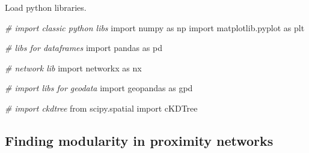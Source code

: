 \documentclass[]{article}
\newenvironment{Shaded}{\begin{snugshade}}{\end{snugshade}}
\newcommand{\CommentTok}[1]{\textcolor[rgb]{0.56,0.35,0.01}{\textit{#1}}}
\newcommand{\ImportTok}[1]{#1}
\newcommand{\NormalTok}[1]{#1}
\begin{document}
Load python libraries.

\begin{Shaded}
\begin{Highlighting}[numbers=left,,]
\CommentTok{# import classic python libs}
\ImportTok{import}\NormalTok{ numpy }\ImportTok{as}\NormalTok{ np}
\ImportTok{import}\NormalTok{ matplotlib.pyplot }\ImportTok{as}\NormalTok{ plt}

\CommentTok{# libs for dataframes}
\ImportTok{import}\NormalTok{ pandas }\ImportTok{as}\NormalTok{ pd}

\CommentTok{# network lib}
\ImportTok{import}\NormalTok{ networkx }\ImportTok{as}\NormalTok{ nx}

\CommentTok{# import libs for geodata}
\ImportTok{import}\NormalTok{ geopandas }\ImportTok{as}\NormalTok{ gpd}

\CommentTok{# import ckdtree}
\ImportTok{from}\NormalTok{ scipy.spatial }\ImportTok{import}\NormalTok{ cKDTree}
\end{Highlighting}
\end{Shaded}

\hypertarget{finding-modularity-in-proximity-networks}{%
\subsection{Finding modularity in proximity networks}\label{finding-modularity-in-proximity-networks}}
\end{document}
